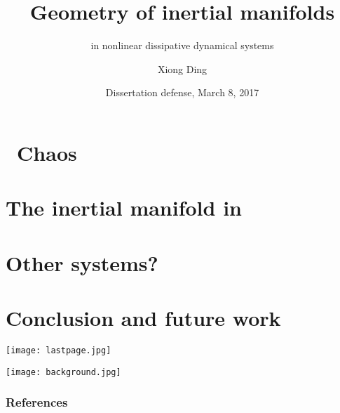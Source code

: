 \documentclass[mathserif, handout]{beamer}
\title[Inertial Manifolds] %
{Geometry of inertial manifolds }
\subtitle{in nonlinear dissipative dynamical systems}
\author[X. Ding] %
{Xiong Ding %
}
\institute[Gatech] %
{
  Center for Nonlinear Science \\
  School of Physics \\
  Georgia Institute of Technology
}
\date[Dissertation defense] %
{ %
  Dissertation defense, March 8, 2017
} %
\begin{document}
\frame{\titlepage} %



\section{\Spt\ Chaos}



\section{\KSe}




\section{The inertial manifold in \KSe}



%


\section{Other systems?}


\section{Conclusion and future work}




\usebackgroundtemplate
{
  \texttt{[image: lastpage.jpg]}%
}
\begin{frame}


  \vspace{2em}


\end{frame}


\usebackgroundtemplate
{
  \texttt{[image: background.jpg]}%
}

\begin{frame}[t, allowframebreaks]
  \frametitle{References}
  \printbibliography
\end{frame}
\end{document}
